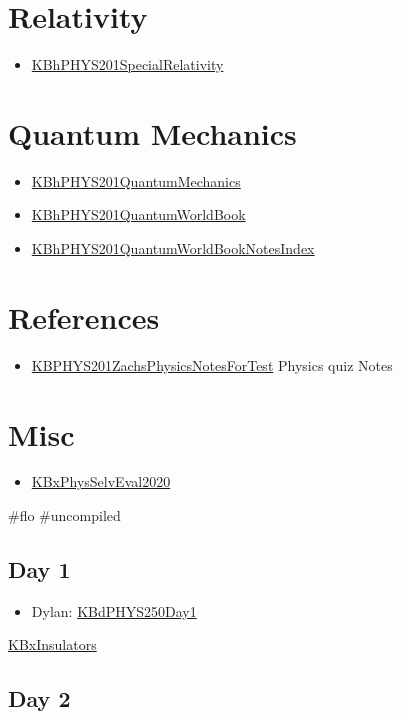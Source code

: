 \documentclass[letterpaper]{article}
\begin{document}
\section{Relativity}
\label{sec:orgf90dae7}
\begin{itemize}
\item \href{KBhPHYS201SpecialRelativity.org}{KBhPHYS201SpecialRelativity}
\end{itemize}

\section{Quantum Mechanics}
\label{sec:org8d67030}
\begin{itemize}
\item \href{KBhPHYS201QuantumMechanics.org}{KBhPHYS201QuantumMechanics}
\item \href{KBhPHYS201QuantumWorldBook.org}{KBhPHYS201QuantumWorldBook}
\item \href{KBhPHYS201QuantumWorldBookNotesIndex.org}{KBhPHYS201QuantumWorldBookNotesIndex}
\end{itemize}

\section{References}
\label{sec:org2f8ce75}
\begin{itemize}
\item \href{KBPHYS201ZachsPhysicsNotesForTest.org}{KBPHYS201ZachsPhysicsNotesForTest}
Physics quiz Notes
\end{itemize}

\section{Misc}
\label{sec:orga127c33}
\begin{itemize}
\item \href{KBxPhysSelvEval2020.org}{KBxPhysSelvEval2020}
\end{itemize}

\#flo \#uncompiled

\subsection{Day 1}
\label{sec:orgcc14ec3}
\begin{itemize}
\item Dylan: \href{KBdPHYS250Day1.org}{KBdPHYS250Day1}
\end{itemize}

\href{KBxInsulators.org}{KBxInsulators}

\subsection{Day 2}
\label{sec:orge16b03a}
\end{document}
